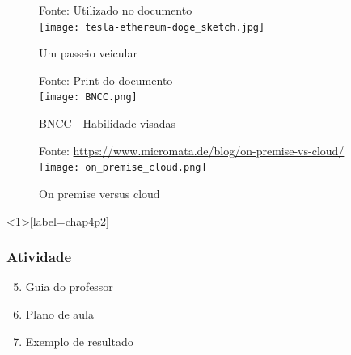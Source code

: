 \documentclass[aspectratio=43,8pt]{beamer}%
\begin{document}
\begin{frame}[noframenumbering]
	\begin{figure}
		\centering
		{\footnotesize Fonte: Utilizado no documento}\\
		\texttt{[image: tesla-ethereum-doge\_sketch.jpg]}
		\caption{Um passeio veicular}
	\end{figure}
\end{frame}
\begin{frame}[noframenumbering]
	\begin{figure}
		\centering
		{\footnotesize Fonte: Print do documento}\\
		\texttt{[image: BNCC.png]}
		\caption{BNCC - Habilidade visadas}
	\end{figure}
\end{frame}
\begin{frame}[noframenumbering]
	\begin{figure}
		\centering
		{\footnotesize Fonte: \url{https://www.micromata.de/blog/on-premise-vs-cloud/}}\\
		\texttt{[image: on\_premise\_cloud.png]}
		\caption{On premise versus cloud}
	\end{figure}
\end{frame}

\begin{frame}<1>[label=chap4p2]
	\frametitle{Atividade}
	\begin{keypoint}
		
		\begin{enumerate}
			\setcounter{enumi}{4}
			\item Guia do professor
\pause
			
			\item Plano de aula 
\pause
			
			\item Exemplo de resultado \pause
			 
		\end{enumerate} 
	\end{keypoint}
\end{frame}
\end{document}
